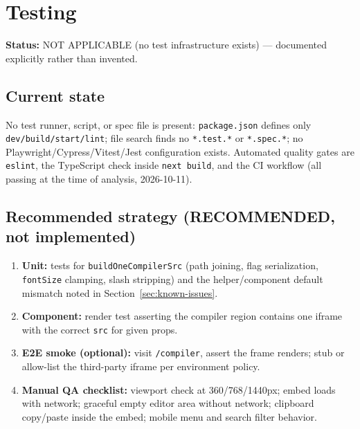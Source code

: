\section{Testing}
\label{sec:testing}

\textbf{Status:} NOT APPLICABLE (no test infrastructure exists) --- documented explicitly rather than invented.

\subsection{Current state}
No test runner, script, or spec file is present: \texttt{package.json} defines only \texttt{dev/build/start/lint}; file search finds no \texttt{*.test.*} or \texttt{*.spec.*}; no Playwright/Cypress/Vitest/Jest configuration exists. Automated quality gates are \texttt{eslint}, the TypeScript check inside \texttt{next build}, and the CI workflow (all passing at the time of analysis, 2026-10-11).

\subsection{Recommended strategy (RECOMMENDED, not implemented)}
\begin{enumerate}
\item \textbf{Unit:} tests for \texttt{buildOneCompilerSrc} (path joining, flag serialization, \texttt{fontSize} clamping, slash stripping) and the helper/component default mismatch noted in Section~\ref{sec:known-issues}.
\item \textbf{Component:} render test asserting the compiler region contains one iframe with the correct \texttt{src} for given props.
\item \textbf{E2E smoke (optional):} visit \texttt{/compiler}, assert the frame renders; stub or allow-list the third-party iframe per environment policy.
\item \textbf{Manual QA checklist:} viewport check at 360/768/1440px; embed loads with network; graceful empty editor area without network; clipboard copy/paste inside the embed; mobile menu and search filter behavior.
\end{enumerate}
